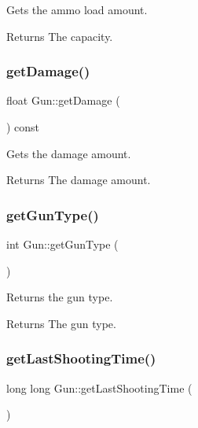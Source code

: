 Gets the ammo load amount. 

\begin{DoxyReturn}{Returns}
The capacity. 
\end{DoxyReturn}
\mbox{\label{class_gun_a6f42c3ba24464b315e1b800b05d7720a}} 
\subsubsection{\texorpdfstring{getDamage()}{getDamage()}}
{\footnotesize\ttfamily float Gun\+::get\+Damage (\begin{DoxyParamCaption}{ }\end{DoxyParamCaption}) const\hspace{0.3cm}{\ttfamily [inline]}}



Gets the damage amount. 

\begin{DoxyReturn}{Returns}
The damage amount. 
\end{DoxyReturn}
\mbox{\label{class_gun_a3d411e267b0879db941feb0b47169103}} 
\subsubsection{\texorpdfstring{getGunType()}{getGunType()}}
{\footnotesize\ttfamily int Gun\+::get\+Gun\+Type (\begin{DoxyParamCaption}{ }\end{DoxyParamCaption})\hspace{0.3cm}{\ttfamily [inline]}}



Returns the gun type. 

\begin{DoxyReturn}{Returns}
The gun type. 
\end{DoxyReturn}
\mbox{\label{class_gun_ac23d10133e36fe70dfdf37e411a698e6}} 
\subsubsection{\texorpdfstring{getLastShootingTime()}{getLastShootingTime()}}
{\footnotesize\ttfamily long long Gun\+::get\+Last\+Shooting\+Time (\begin{DoxyParamCaption}{ }\end{DoxyParamCaption})\hspace{0.3cm}{\ttfamily [inline]}}




